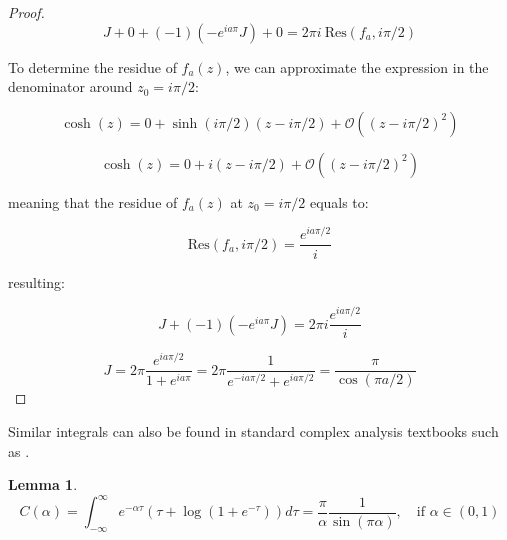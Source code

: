 \documentclass{article}
\theoremstyle{definition}
\newtheorem{lemma}{Lemma}[section]
\begin{document}
\begin{proof}
    \begin{equation}
        J + 0 + (-1) (- e^{i a \pi} J) + 0 = 2 \pi i \ \mathrm{Res}(f_a,i \pi/2)
    \end{equation}

    To determine the residue of $f_a(z)$, we can approximate the expression in the denominator around $z_0=i \pi/2$:

    \begin{equation}
        \cosh(z) = 0 + \sinh(i \pi/2) (z-i \pi/2) + \mathcal{O}((z-i \pi/2)^2)
    \end{equation}

    \begin{equation}
        \cosh(z) = 0 + i (z-i \pi/2) + \mathcal{O}((z-i \pi/2)^2)
    \end{equation}

    meaning that the residue of $f_a(z)$ at $z_0=i \pi/2$ equals to:

    \begin{equation}
        \mathrm{Res}(f_a,i \pi/2) = \frac{e^{i a \pi/2}}{i}
    \end{equation}

    resulting:

    \begin{equation}
        J + (-1) (- e^{i a \pi} J) = 2 \pi i \frac{e^{i a \pi/2}}{i}
    \end{equation}

    \begin{equation}
        J = 2 \pi \frac{e^{i a \pi/2}}{1+e^{i a \pi}} =
        2 \pi \frac{1}{e^{-i a \pi/2}+e^{i a \pi/2}} =
        \frac{\pi}{\cos(\pi a/2)}
    \end{equation}
    
\end{proof}

Similar integrals can also be found in standard complex analysis textbooks such as \cite{book:SteinComplexAnalysis}.

\begin{lemma}
\label{lemma:C(alpha)}
    \begin{equation}
        C(\alpha) = \int_{-\infty}^\infty e^{-\alpha \tau} (\tau + \log \left ( 1 + e^{-\tau} \right )) d \tau = \frac{\pi}{\alpha} \frac{1}{\sin(\pi \alpha)}, \quad \text{if } \alpha \in (0,1)
    \end{equation}
\end{lemma}
\end{document}
